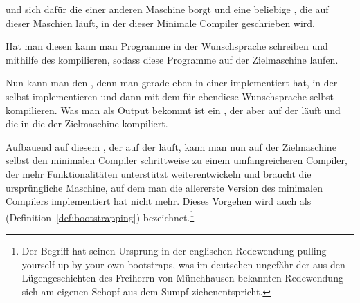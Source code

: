   und sich dafür die  einer anderen Maschine borgt und eine beliebige , die auf dieser Maschien läuft, in der dieser Minimale Compiler geschrieben wird.

  Hat man diesen  kann man Programme in der Wunschsprache schreiben und mithilfe des   kompilieren, sodass diese Programme auf der Zielmaschine laufen.

  Nun kann man den , denn man gerade eben in einer  implementiert hat, in der  selbst implementieren und dann mit dem  für ebendiese Wunschsprache selbst kompilieren. Was man als Output bekommt ist ein , der aber auf der  läuft und die  in die  der Zielmaschine kompiliert.

  Aufbauend auf diesem , der auf der  läuft, kann man nun auf der Zielmaschine selbst  den minimalen Compiler schrittweise zu einem umfangreicheren Compiler, der mehr Funktionalitäten unterstützt weiterentwickeln und braucht die ursprüngliche Maschine, auf dem man die allererste Version des minimalen Compilers implementiert hat nicht mehr. Dieses Vorgehen wird auch als  (Definition~\ref{def:bootstrapping}) bezeichnet.\footnote{Der Begriff hat seinen Ursprung in der englischen Redewendung \glqq pulling yourself up by your own bootstraps\grqq, was im deutschen ungefähr der aus den Lügengeschichten des Freiherrn von Münchhausen bekannten Redewendung \glqq sich am eigenen Schopf aus dem Sumpf ziehen\grqq entspricht.}



